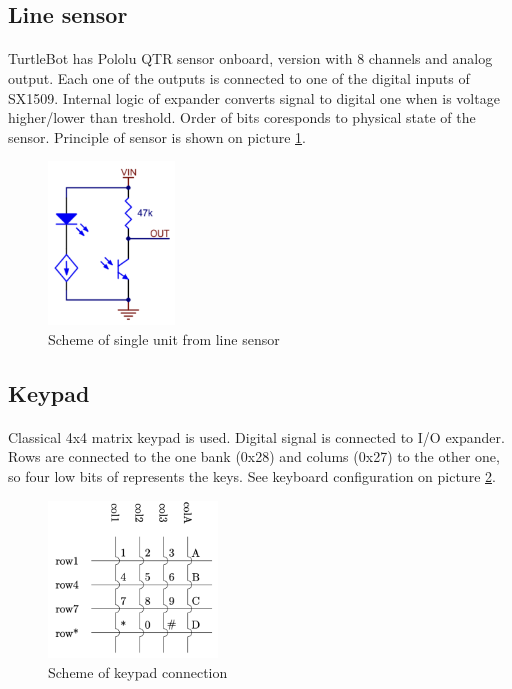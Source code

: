 \documentclass[english]{article}
\begin{document}
	\subsection{Line sensor}

		\paragraph{}
		TurtleBot has Pololu QTR sensor\cite{line_sensor} onboard, version with 8 channels and analog output. Each one of the outputs is connected to one of the
		digital inputs of SX1509. Internal logic of expander converts signal to digital one when is voltage higher/lower than treshold. Order of bits coresponds to physical state of the sensor. Principle of sensor is shown on picture \ref{fig.lab1.line_sensor}.

		\begin{figure}[H]
			\centering
			\includegraphics[width=0.3\textwidth]{figures/line_sensor.png}
			\caption{Scheme of single unit from line sensor}
			\label{fig.lab1.line_sensor}
		\end{figure}
		
	\subsection{Keypad}
		\paragraph{}
		Classical 4x4 matrix keypad is used. Digital signal is connected to I/O expander. Rows are connected to the one bank (0x28) and colums (0x27) to the other one,
		so four low bits of represents the keys. See keyboard configuration on picture \ref{fig.lab1.keypad}.

		\begin{figure}[H]
			\centering
			\includegraphics[width=0.4\textwidth]{figures/keypad.png}
			\caption{Scheme of keypad connection}
			\label{fig.lab1.keypad}
		\end{figure}
\end{document}
